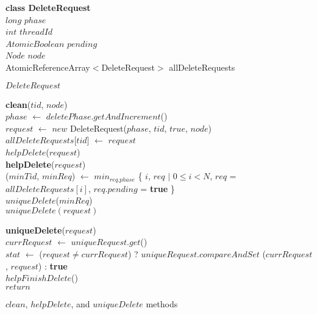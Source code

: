 \documentclass{llncs}
\begin{document}
\begin{appendix}
\begin{algorithm}
\small
\SetAlgoLined
\textbf{class DeleteRequest}{}\\
		\hspace{5mm}$long$ $phase$\\
		\hspace{5mm}$int$ $threadId$\\
		\hspace{5mm}$AtomicBoolean$ $pending$\\
        \hspace{5mm}$Node$ $node$ \\	

\vskip 2mm
AtomicReferenceArray$<$DeleteRequest$>$ allDeleteRequests

\caption{$DeleteRequest$ } \label{alg:deleteclasses}
\end{algorithm}



\begin{algorithm}
\small
\SetAlgoLined
\textbf{clean}($tid$, $node$){}\\
$phase$ $\leftarrow$ $deletePhase.getAndIncrement$()\\
$request$ $\leftarrow$  $new$ DeleteRequest($phase$, $tid$, $true$, $node$) \\
$allDeleteRequests$[$tid$] $\leftarrow$  $request$ \label{line:alldel}\\
$helpDelete$($request$)\\


\textbf{helpDelete}($request$){}\\
			($minTid$, $minReq$)  $\leftarrow$ $min_{req.phase}$ \{ $i$, $req$ $\mid$ $0 \le i < N$, $req$ = $allDeleteRequests[i]$,
$req.pending$ = \textbf{true} \} \\
			$uniqueDelete$($minReq$) \\
			 {
				$uniqueDelete(request)$
			}
	
\textbf{uniqueDelete}($request$){}\\
		{
			$currRequest$ $\leftarrow$ $uniqueRequest.get$()\\
			{
				{
					$stat$ $\leftarrow$ ($request \ne currRequest$) ? $uniqueRequest$.$compareAndSet$ ($currRequest$,
$request$) :
\textbf{true} \label{line:cleanCAS}\\
					$helpFinishDelete$()\\
					 {
						$return$
					}
				}
			}
		}
\caption{$clean$, $helpDelete$, and $uniqueDelete$ methods} \label{alg:clean}
\end{algorithm}
	

\end{appendix}
\end{document}

